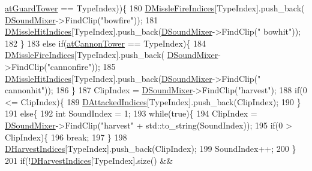 \begin{DoxyCode}
      \hyperlink{GameDataTypes_8h_a5600d4fc433b83300308921974477feca65fa6c84ff93972a623793d4ee72d87f}{atGuardTower} == TypeIndex))\{
180             \hyperlink{classCSoundEventRenderer_ab781b03b940441c7d23fe1d6031d773e}{DMissleFireIndices}[TypeIndex].push\_back(
      \hyperlink{classCSoundEventRenderer_a5abf598a7e8783d9cc78e0d33a65c9c2}{DSoundMixer}->FindClip(\textcolor{stringliteral}{"bowfire"}));
181             \hyperlink{classCSoundEventRenderer_aa551953be1c1e7926432996c78c6d8d8}{DMissleHitIndices}[TypeIndex].push\_back(\hyperlink{classCSoundEventRenderer_a5abf598a7e8783d9cc78e0d33a65c9c2}{DSoundMixer}->FindClip(\textcolor{stringliteral}{"
      bowhit"}));   
182         \}
183         \textcolor{keywordflow}{else} \textcolor{keywordflow}{if}(\hyperlink{GameDataTypes_8h_a5600d4fc433b83300308921974477feca226f6f1968ce76c97cdabb780a6c289d}{atCannonTower} == TypeIndex)\{
184             \hyperlink{classCSoundEventRenderer_ab781b03b940441c7d23fe1d6031d773e}{DMissleFireIndices}[TypeIndex].push\_back(
      \hyperlink{classCSoundEventRenderer_a5abf598a7e8783d9cc78e0d33a65c9c2}{DSoundMixer}->FindClip(\textcolor{stringliteral}{"cannonfire"}));
185             \hyperlink{classCSoundEventRenderer_aa551953be1c1e7926432996c78c6d8d8}{DMissleHitIndices}[TypeIndex].push\_back(\hyperlink{classCSoundEventRenderer_a5abf598a7e8783d9cc78e0d33a65c9c2}{DSoundMixer}->FindClip(\textcolor{stringliteral}{"
      cannonhit"}));   
186         \}
187         ClipIndex = \hyperlink{classCSoundEventRenderer_a5abf598a7e8783d9cc78e0d33a65c9c2}{DSoundMixer}->FindClip(\textcolor{stringliteral}{"harvest"});
188         \textcolor{keywordflow}{if}(0 <= ClipIndex)\{
189             \hyperlink{classCSoundEventRenderer_a5ffc7dd4911c09c23987c6d1a8776c26}{DAttackedIndices}[TypeIndex].push\_back(ClipIndex);
190         \}
191         \textcolor{keywordflow}{else}\{
192             \textcolor{keywordtype}{int} SoundIndex = 1;
193             \textcolor{keywordflow}{while}(\textcolor{keyword}{true})\{
194                 ClipIndex = \hyperlink{classCSoundEventRenderer_a5abf598a7e8783d9cc78e0d33a65c9c2}{DSoundMixer}->FindClip(\textcolor{stringliteral}{"harvest"} + std::to\_string(SoundIndex));
195                 \textcolor{keywordflow}{if}(0 > ClipIndex)\{
196                     \textcolor{keywordflow}{break};   
197                 \}
198                 \hyperlink{classCSoundEventRenderer_abe64071cbc49cffab8a5c6160b7f821d}{DHarvestIndices}[TypeIndex].push\_back(ClipIndex);
199                 SoundIndex++;
200             \}
201             \textcolor{keywordflow}{if}(!\hyperlink{classCSoundEventRenderer_abe64071cbc49cffab8a5c6160b7f821d}{DHarvestIndices}[TypeIndex].size() && 

\end{DoxyCode}
